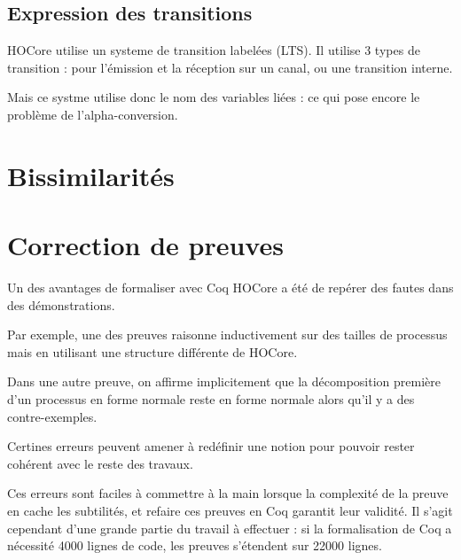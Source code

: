\documentclass{article}
\begin{document}
\subsection{Expression des transitions}
HOCore utilise un systeme de transition labelées (LTS). Il utilise 3 types de transition : pour l'émission et la réception sur un canal, ou une transition interne.

Mais ce systme utilise donc le nom des variables liées : ce qui pose encore le problème de l'alpha-conversion.


\section{Bissimilarités}


\section{Correction de preuves}
Un des avantages de formaliser avec Coq HOCore a été de repérer des fautes dans des démonstrations.

Par exemple, une des preuves raisonne inductivement sur des tailles de processus mais en utilisant une structure différente de HOCore.

Dans une autre preuve, on affirme implicitement que la décomposition première d'un processus en forme normale reste en forme normale alors qu'il y a des contre-exemples.

Certines erreurs peuvent amener à redéfinir une notion pour pouvoir rester cohérent avec le reste des travaux.

Ces erreurs sont faciles à commettre à la main lorsque la complexité de la preuve en cache les subtilités, et refaire ces preuves en Coq garantit leur validité. Il s'agit cependant d'une grande partie du travail à effectuer : si la formalisation de Coq a nécessité 4000 lignes de code, les preuves s'étendent sur 22000 lignes. 
\end{document}

